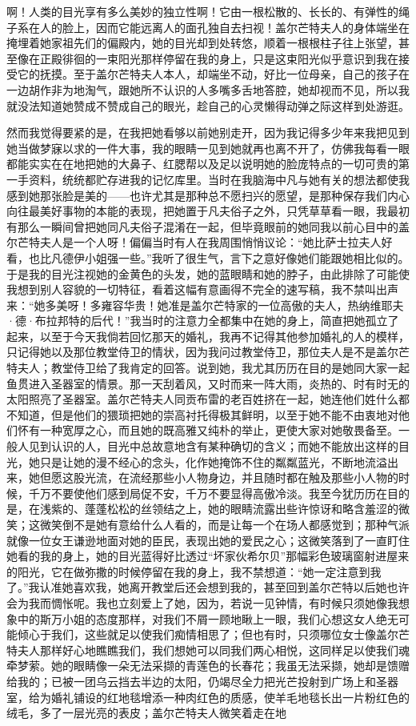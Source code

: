 \par 啊！人类的目光享有多么美妙的独立性啊！它由一根松散的、长长的、有弹性的绳子系在人的脸上，因而它能远离人的面孔独自去扫视！盖尔芒特夫人的身体端坐在掩埋着她家祖先们的偏殿内，她的目光却到处转悠，顺着一根根柱子往上张望，甚至像在正殿徘徊的一束阳光那样停留在我的身上，只是这束阳光似乎意识到我在接受它的抚摸。至于盖尔芒特夫人本人，却端坐不动，好比一位母亲，自己的孩子在一边胡作非为地淘气，跟她所不认识的人多嘴多舌地答腔，她却视而不见，所以我就没法知道她赞成不赞成自己的眼光，趁自己的心灵懒得动弹之际这样到处游逛。
\par 然而我觉得要紧的是，在我把她看够以前她别走开，因为我记得多少年来我把见到她当做梦寐以求的一件大事，我的眼睛一见到她就再也离不开了，仿佛我每看一眼都能实实在在地把她的大鼻子、红腮帮以及足以说明她的脸庞特点的一切可贵的第一手资料，统统都贮存进我的记忆库里。当时在我脑海中凡与她有关的想法都使我感到她那张脸是美的——也许尤其是那种总不愿扫兴的愿望，是那种保存我们内心向往最美好事物的本能的表现，把她置于凡夫俗子之外，只凭草草看一眼，我最初有那么一瞬间曾把她同凡夫俗子混淆在一起，但毕竟眼前的她同我以前心目中的盖尔芒特夫人是一个人呀！偏偏当时有人在我周围悄悄议论：“她比萨士拉夫人好看，也比凡德伊小姐强一些。”我听了很生气，言下之意好像她们能跟她相比似的。于是我的目光注视她的金黄色的头发，她的蓝眼睛和她的脖子，由此排除了可能使我想到别人容貌的一切特征，看着这幅有意画得不完全的速写稿，我不禁叫出声来：“她多美呀！多雍容华贵！她准是盖尔芒特家的一位高傲的夫人，热纳维耶夫·德·布拉邦特的后代！”我当时的注意力全都集中在她的身上，简直把她孤立了起来，以至于今天我倘若回忆那天的婚礼，我再不记得其他参加婚礼的人的模样，只记得她以及那位教堂侍卫的情状，因为我问过教堂侍卫，那位夫人是不是盖尔芒特夫人；教堂侍卫给了我肯定的回答。说到她，我尤其历历在目的是她同大家一起鱼贯进入圣器室的情景。那一天刮着风，又时而来一阵大雨，炎热的、时有时无的太阳照亮了圣器室。盖尔芒特夫人同贡布雷的老百姓挤在一起，她连他们姓什么都不知道，但是他们的猥琐把她的崇高衬托得极其鲜明，以至于她不能不由衷地对他们怀有一种宽厚之心，而且她的既高雅又纯朴的举止，更使大家对她敬畏备至。一般人见到认识的人，目光中总故意地含有某种确切的含义；而她不能放出这样的目光，她只是让她的漫不经心的念头，化作她掩饰不住的粼粼蓝光，不断地流溢出来，她但愿这股光流，在流经那些小人物身边，并且随时都在触及那些小人物的时候，千万不要使他们感到局促不安，千万不要显得高傲冷淡。我至今犹历历在目的是，在浅紫的、蓬蓬松松的丝领结之上，她的眼睛流露出些许惊讶和略含羞涩的微笑；这微笑倒不是她有意给什么人看的，而是让每一个在场人都感觉到；那种气派就像一位女王谦逊地面对她的臣民，表现出她的爱民之心；这微笑落到了一直盯住她看的我的身上，她的目光蓝得好比透过“坏家伙希尔贝”那幅彩色玻璃窗射进屋来的阳光，它在做弥撒的时候停留在我的身上，我不禁想道：“她一定注意到我了。”我认准她喜欢我，她离开教堂后还会想到我的，甚至回到盖尔芒特以后她也许会为我而惆怅呢。我也立刻爱上了她，因为，若说一见钟情，有时候只须她像我想象中的斯万小姐的态度那样，对我们不屑一顾地瞅上一眼，我们心想这女人绝无可能倾心于我们，这些就足以使我们痴情相思了；但也有时，只须哪位女士像盖尔芒特夫人那样好心地瞧瞧我们，我们想她可以同我们两心相悦，这同样足以使我们魂牵梦萦。她的眼睛像一朵无法采撷的青莲色的长春花；我虽无法采撷，她却是馈赠给我的；已被一团乌云挡去半边的太阳，仍竭尽全力把光芒投射到广场上和圣器室，给为婚礼铺设的红地毯增添一种肉红色的质感，使羊毛地毯长出一片粉红色的绒毛，多了一层光亮的表皮；盖尔芒特夫人微笑着走在地
